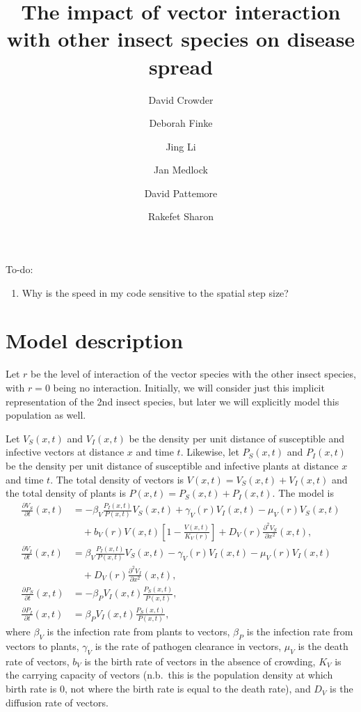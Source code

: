 \documentclass{article}
\title{The impact of vector interaction with other insect species on
  disease spread}
\author{
  David Crowder
  \and
  Deborah Finke
  \and
  Jing Li
  \and
  Jan Medlock
  \and
  David Pattemore
  \and
  Rakefet Sharon
}
\begin{document}
\maketitle

To-do:
\begin{enumerate}
\item Why is the speed in my code sensitive to the spatial step size?
\end{enumerate}


\section{Model description}

Let $r$ be the level of interaction of the vector species with the
other insect species, with $r = 0$ being no interaction.  Initially,
we will consider just this implicit representation of the 2nd insect
species, but later we will explicitly model this population as well.

Let $V_S(x, t)$ and $V_I(x, t)$ be the density per unit distance of
susceptible and infective vectors at distance $x$ and time $t$.
Likewise, let $P_S(x, t)$ and $P_I(x, t)$ be the density per unit
distance of susceptible and infective plants at distance $x$ and time
$t$.  The total density of vectors is
$V(x, t) = V_S(x, t) + V_I(x, t)$ and the total density of plants is
$P(x, t) = P_S(x, t) + P_I(x, t)$.  The model is
\begin{equation}
  \begin{split}
    \frac{\partial V_S}{\partial t}(x, t)
    &= - \beta_V \frac{P_I(x, t)}{P(x, t)} V_S(x, t)
    + \gamma_V(r) V_I(x, t)
    - \mu_V(r) V_S(x, t)
    \\
    & \quad
    {} + b_V(r) V(x, t) \left[1 - \frac{V(x, t)}{K_V(r)}\right]
    + D_V(r) \frac{\partial^2 V_S}{\partial x^2}(x, t),
    \\
    \frac{\partial V_I}{\partial t}(x, t)
    &= \beta_V \frac{P_I(x, t)}{P(x, t)} V_S(x, t)
    - \gamma_V(r) V_I(x, t)
    - \mu_V(r) V_I(x, t)
    \\
    & \quad
    {} + D_V(r) \frac{\partial^2 V_I}{\partial x^2}(x, t),
    \\
    \frac{\partial P_S}{\partial t}(x, t)
    &= - \beta_P V_I(x, t) \frac{P_S(x, t)}{P(x, t)},
    \\
    \frac{\partial P_I}{\partial t}(x, t)
    &= \beta_P V_I(x, t) \frac{P_S(x, t)}{P(x, t)},
  \end{split}
\end{equation}
where $\beta_V$ is the infection rate from plants to vectors,
$\beta_P$ is the infection rate from vectors to plants, $\gamma_V$ is
the rate of pathogen clearance in vectors, $\mu_V$ is the death rate
of vectors, $b_V$ is the birth rate of vectors in the absence of
crowding, $K_V$ is the carrying capacity of vectors (n.b.~this is the
population density at which birth rate is $0$, not where the birth
rate is equal to the death rate), and $D_V$ is the diffusion rate of
vectors.
\end{document}
